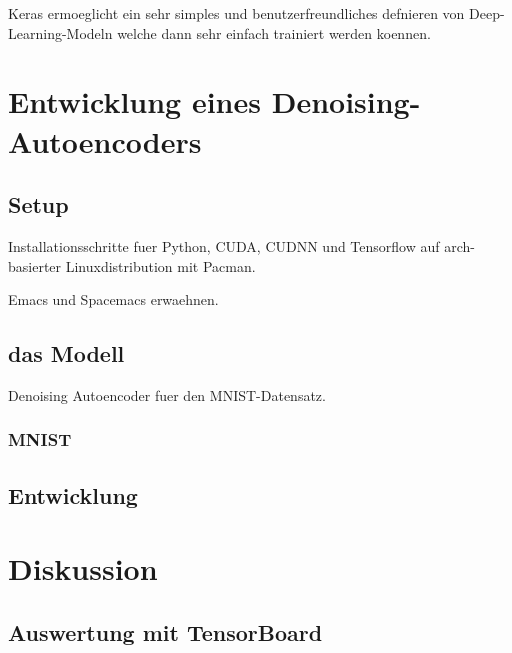 Keras ermoeglicht ein sehr simples und benutzerfreundliches defnieren von
Deep-Learning-Modeln welche dann sehr einfach trainiert werden koennen.

\chapter{Entwicklung eines Denoising-Autoencoders}

\section{Setup}
Installationsschritte fuer Python, CUDA, CUDNN und Tensorflow auf arch-basierter Linuxdistribution mit Pacman.

Emacs und Spacemacs erwaehnen.

\section{das Modell}
Denoising Autoencoder fuer den MNIST-Datensatz.

\subsection{MNIST}

\section{Entwicklung}




\chapter{Diskussion}
\section{Auswertung mit TensorBoard}


